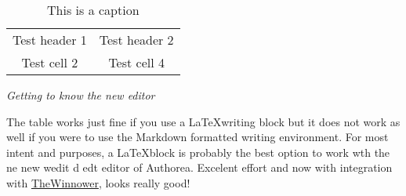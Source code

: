 \begin{table} 
    \begin{tabular}{ c c }
        Test header 1 & Test header 2 \\ 
        Test cell 2 & Test cell 4 \\ 
    \end{tabular} 
    \caption{This is a caption} 
\end{table}\textit{Getting to know the new editor}



The table works just fine if you use a \LaTeX writing block but it does not work as well if you were to use the Markdown formatted writing environment. For most intent and purposes, a \LaTeX block is probably the best option to work wth the ne new wedit d edt editor of Authorea. Excelent effort and now with integration with \href{http://www.thewinnower.com}{TheWinnower}, looks really good!

